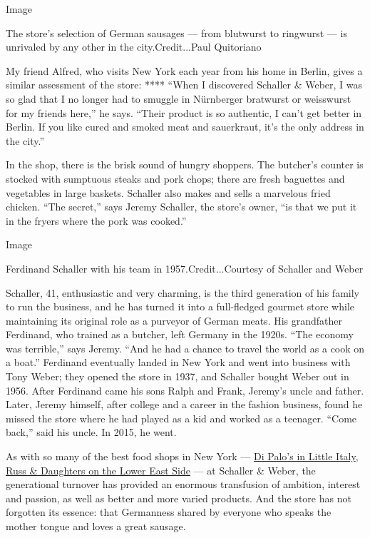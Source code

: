 Image

The store's selection of German sausages --- from blutwurst to ringwurst
--- is unrivaled by any other in the city.Credit...Paul Quitoriano

My friend Alfred, who visits New York each year from his home in Berlin,
gives a similar assessment of the store: **** ``When I discovered
Schaller \& Weber, I was so glad that I no longer had to smuggle in
Nürnberger bratwurst or weisswurst for my friends here,'' he says.
``Their product is so authentic, I can't get better in Berlin. If you
like cured and smoked meat and sauerkraut, it's the only address in the
city.''

In the shop, there is the brisk sound of hungry shoppers. The butcher's
counter is stocked with sumptuous steaks and pork chops; there are fresh
baguettes and vegetables in large baskets. Schaller also makes and sells
a marvelous fried chicken. ``The secret,'' says Jeremy Schaller, the
store's owner, ``is that we put it in the fryers where the pork was
cooked.''

Image

Ferdinand Schaller with his team in 1957.Credit...Courtesy of Schaller
and Weber

Schaller, 41, enthusiastic and very charming, is the third generation of
his family to run the business, and he has turned it into a full-fledged
gourmet store while maintaining its original role as a purveyor of
German meats. His grandfather Ferdinand, who trained as a butcher, left
Germany in the 1920s. ``The economy was terrible,'' says Jeremy. ``And
he had a chance to travel the world as a cook on a boat.'' Ferdinand
eventually landed in New York and went into business with Tony Weber;
they opened the store in 1937, and Schaller bought Weber out in 1956.
After Ferdinand came his sons Ralph and Frank, Jeremy's uncle and
father. Later, Jeremy himself, after college and a career in the fashion
business, found he missed the store where he had played as a kid and
worked as a teenager. ``Come back,'' said his uncle. In 2015, he went.

As with so many of the best food shops in New York ---
\href{https://www.nytimes3xbfgragh.onion/2019/04/17/t-magazine/di-palos-nyc-store.html}{Di
Palo's in Little Italy},
\href{https://www.nytimes3xbfgragh.onion/2018/12/03/t-magazine/russ-and-daughters-new-york-history.html}{Russ
\& Daughters on the Lower East Side} --- at Schaller \& Weber, the
generational turnover has provided an enormous transfusion of ambition,
interest and passion, as well as better and more varied products. And
the store has not forgotten its essence: that Germanness shared by
everyone who speaks the mother tongue and loves a great sausage.

